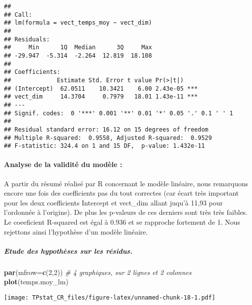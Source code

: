 \documentclass[
]{article}
\newenvironment{Shaded}{\begin{snugshade}}{\end{snugshade}}
\newcommand{\CommentTok}[1]{\textcolor[rgb]{0.56,0.35,0.01}{\textit{#1}}}
\newcommand{\DataTypeTok}[1]{\textcolor[rgb]{0.13,0.29,0.53}{#1}}
\newcommand{\DecValTok}[1]{\textcolor[rgb]{0.00,0.00,0.81}{#1}}
\newcommand{\KeywordTok}[1]{\textcolor[rgb]{0.13,0.29,0.53}{\textbf{#1}}}
\newcommand{\NormalTok}[1]{#1}
\begin{document}
\begin{verbatim}
## 
## Call:
## lm(formula = vect_temps_moy ~ vect_dim)
## 
## Residuals:
##     Min      1Q  Median      3Q     Max 
## -29.947  -5.314  -2.264  12.819  18.108 
## 
## Coefficients:
##             Estimate Std. Error t value Pr(>|t|)    
## (Intercept)  62.0511    10.3421    6.00 2.43e-05 ***
## vect_dim     14.3704     0.7979   18.01 1.43e-11 ***
## ---
## Signif. codes:  0 '***' 0.001 '**' 0.01 '*' 0.05 '.' 0.1 ' ' 1
## 
## Residual standard error: 16.12 on 15 degrees of freedom
## Multiple R-squared:  0.9558, Adjusted R-squared:  0.9529 
## F-statistic: 324.4 on 1 and 15 DF,  p-value: 1.432e-11
\end{verbatim}

\hypertarget{analyse-de-la-validituxe9-du-moduxe8le-1}{%
\paragraph{Analyse de la validité du modèle
:}\label{analyse-de-la-validituxe9-du-moduxe8le-1}}

A partir du résumé réalisé par R concernant le modèle linéaire, nous
remarquons encore une fois des coefficients pas du tout correctes (car
écart très important pour les deux coefficients Intercept et vect\_dim
allant juqu'à 11,93 pour l'ordonnée à l'origine). De plus les p-valeurs
de ces derniers sont très très faibles. Le coeeficient R-squared est
égal à 0.936 et se rapproche fortement de 1. Nous rejettons ainsi
l'hypothèse d'un modèle linéaire.

\hypertarget{etude-des-hypothuxe8ses-sur-les-ruxe9sidus.}{%
\subparagraph{Etude des hypothèses sur les
résidus.}\label{etude-des-hypothuxe8ses-sur-les-ruxe9sidus.}}

\begin{Shaded}
\begin{Highlighting}[]
\KeywordTok{par}\NormalTok{(}\DataTypeTok{mfrow=}\KeywordTok{c}\NormalTok{(}\DecValTok{2}\NormalTok{,}\DecValTok{2}\NormalTok{)) }\CommentTok{# 4 graphiques, sur 2 lignes et 2 colonnes}
\KeywordTok{plot}\NormalTok{(temps.moy_lm)}
\end{Highlighting}
\end{Shaded}

\texttt{[image: TPstat\_CR\_files/figure-latex/unnamed-chunk-18-1.pdf]}
\end{document}
